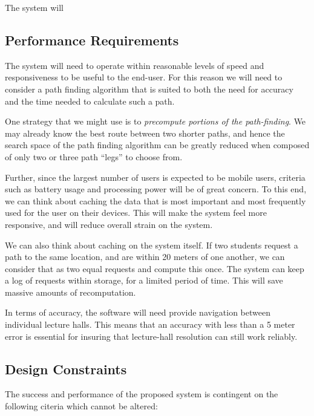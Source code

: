 \documentclass[10pt,a4paper]{article}
\begin{document}
			The system will

		\subsection{Performance Requirements}

			The system will need to operate within reasonable levels of speed and
			responsiveness to be useful to the end-user. For this reason we will need
			to consider a path finding algorithm that is suited to both the need for
			accuracy and the time needed to calculate such a path.

			\medskip

			One strategy that we might use is to \textsl{precompute portions of the
			path-finding}. We may already know the best route between two shorter
			paths, and hence the search space of the path finding algorithm can be
			greatly reduced when composed of only two or three path ``legs'' to choose
			from.

			\medskip

			Further, since the largest number of users is expected to be mobile users,
			criteria such as battery usage and processing power will be of
			great concern. To this end, we can think about caching the data that is
			most important and most frequently used for the user on their devices.
			This will make the system feel more responsive, and will reduce overall
			strain on the system.

			\medskip

			We can also think about caching on the system itself. If two students
			request a path to the same location, and are within 20 meters of one
			another, we can consider that as two equal requests and compute this once.
			The system can keep a log of requests within storage, for a limited period
			of time. This will save massive amounts of recomputation.

			\medskip

			In terms of accuracy, the software will need provide navigation between
			individual lecture halls. This means that an accuracy with less than a 5
			meter error is essential for insuring that lecture-hall resolution can
			still work reliably.

		\subsection{Design Constraints}

			The success and performance of the proposed system is contingent on the
			following citeria which cannot be altered:
\end{document}
